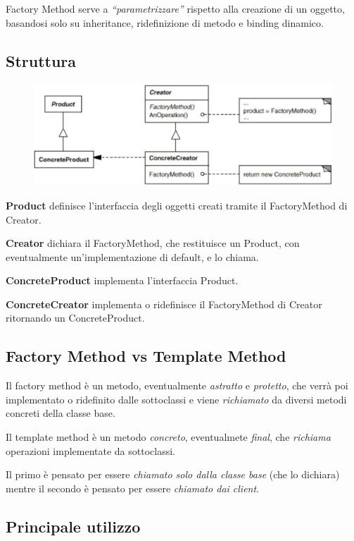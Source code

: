Factory Method serve a \textit{“parametrizzare”} rispetto alla creazione di un oggetto, basandosi solo su inheritance, ridefinizione di metodo e binding dinamico. 

\subsection{Struttura}

\begin{figure}[H]
    \centering
    \includegraphics[width=0.5\linewidth]{../../immagini/pattern_creazionale/struttura_factory_method}
\end{figure}

\textbf{Product} definisce l'interfaccia degli oggetti creati tramite il FactoryMethod di Creator.

\textbf{Creator} dichiara il FactoryMethod, che restituisce un Product, con eventualmente un'implementazione di default, e lo chiama.

\textbf{ConcreteProduct} implementa l'interfaccia Product.

\textbf{ConcreteCreator} implementa o ridefinisce il FactoryMethod di Creator ritornando un ConcreteProduct.

\subsection{Factory Method vs Template Method}

Il factory method è un metodo, eventualmente \textit{astratto} e \textit{protetto}, che verrà poi implementato o ridefinito dalle sottoclassi e viene 
\textit{richiamato} da diversi metodi concreti della classe base.

Il template method è un metodo \textit{concreto}, eventualmete \textit{final}, che \textit{richiama} operazioni implementate da sottoclassi.

Il primo è pensato per essere \textit{chiamato solo dalla classe base} (che lo dichiara) mentre il secondo è pensato per essere \textit{chiamato dai client}.

\subsection{Principale utilizzo}

